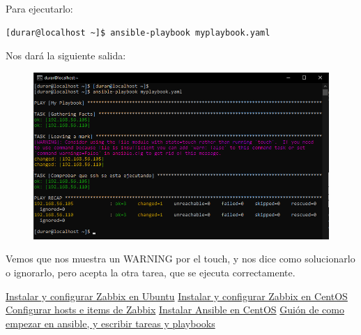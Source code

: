 \documentclass[a4paper]{article}
\begin{document}
\newline Para ejecutarlo:
\begin{lstlisting}[style=bashCentOS]
    [durar@localhost ~]$ ansible-playbook myplaybook.yaml
\end{lstlisting}
Nos dará la siguiente salida:
\begin{figure}[hbt!]
    \centering
    \includegraphics[width=\textwidth]{salida de playbook.png}
\end{figure}
\newline Vemos que nos muestra un WARNING por el touch, y nos dice como solucionarlo o ignorarlo, pero 
acepta la otra tarea, que se ejecuta correctamente.
\newpage
\begin{thebibliography}{99}
    \href{https://www.zabbix.com/la/download?zabbix=5.0&os_distribution=ubuntu&os_version=20.04_focal&db=mysql&ws=apache}{Instalar y configurar Zabbix en Ubuntu}
    \href{https://www.zabbix.com/la/download?zabbix=5.0&os_distribution=centos&os_version=8&db=mysql&ws=apache}{Instalar y configurar Zabbix en CentOS}
    \href{https://www.zabbix.com/documentation/5.0/manual/config}{Configurar hosts e items de Zabbix} 
    \href{https://docs.ansible.com/ansible/latest/installation_guide/intro_installation.html#installing-ansible-on-rhel-centos-or-fedora}{Instalar Ansible en CentOS} 
    \href{https://docs.ansible.com/ansible/latest/user_guide/index.html#getting-started}{Guión de como empezar en ansible, y escribir tareas y playbooks}
\end{thebibliography}
\end{document}
